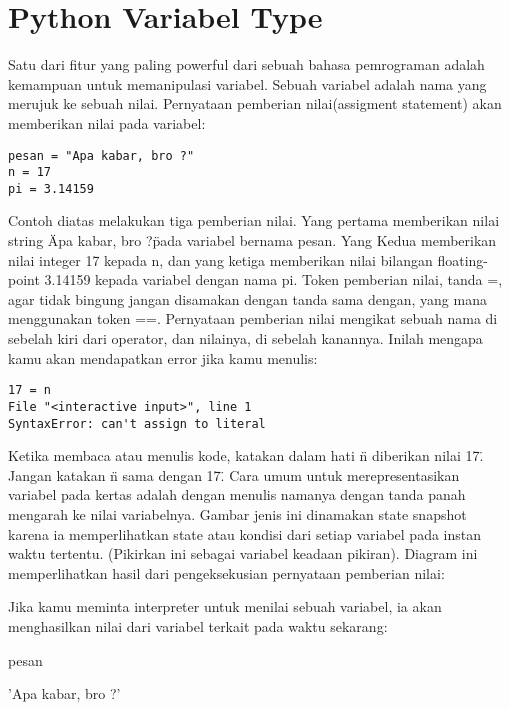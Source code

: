 \section{Python Variabel Type}
Satu dari fitur yang paling powerful dari sebuah bahasa pemrograman adalah kemampuan untuk memanipulasi variabel. Sebuah variabel adalah nama yang merujuk ke sebuah nilai.
Pernyataan pemberian nilai(assigment statement) akan memberikan nilai pada variabel: 
\begin{verbatim}
pesan = "Apa kabar, bro ?" 
n = 17  
pi = 3.14159 
\end{verbatim}
Contoh diatas melakukan tiga pemberian nilai. Yang pertama memberikan nilai string \"Apa kabar, bro ?\" pada variabel bernama pesan. Yang Kedua memberikan nilai integer 17 kepada n, dan yang ketiga memberikan nilai bilangan floating-point 3.14159 kepada variabel dengan nama pi.
Token pemberian nilai, tanda =, agar tidak bingung jangan disamakan dengan tanda sama dengan, yang mana menggunakan token ==. Pernyataan pemberian nilai mengikat sebuah nama di sebelah kiri dari operator, dan nilainya, di sebelah kanannya. Inilah mengapa kamu akan mendapatkan error jika kamu menulis: 
\begin{verbatim}
17 = n 
File "<interactive input>", line 1 
SyntaxError: can't assign to literal 
\end{verbatim}
Ketika membaca atau menulis kode, katakan dalam hati \"n diberikan nilai 17\". Jangan katakan \"n sama dengan 17\".
\vspace{12pt}
\noindent 
Cara umum untuk merepresentasikan variabel pada kertas adalah dengan menulis namanya dengan tanda panah mengarah ke nilai variabelnya. Gambar jenis ini dinamakan $  $state snapshot $  $karena ia memperlihatkan state atau kondisi dari setiap variabel pada instan waktu tertentu. (Pikirkan ini sebagai variabel keadaan pikiran). Diagram ini memperlihatkan hasil dari pengeksekusian pernyataan pemberian nilai: \par
\vspace{12pt}
\vspace{12pt}
\vspace{12pt}
\vspace{12pt}
\noindent 
Jika kamu meminta interpreter untuk menilai sebuah variabel, ia akan menghasilkan nilai dari variabel terkait pada waktu sekarang: \par
\vspace{12pt}
\noindent 
pesan \par
\noindent 
'Apa kabar, bro ?' \par
